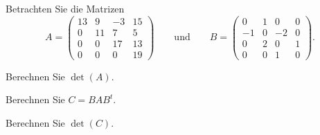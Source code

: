 Betrachten Sie die Matrizen
\[
A=\begin{pmatrix}
13& 9&-3&15\\
 0&11& 7& 5\\
 0& 0&17&13\\
 0& 0& 0&19
\end{pmatrix}
\qquad\text{und}\qquad
B
=
\begin{pmatrix}
   0&  1&  0&  0\\
  -1&  0& -2&  0\\
   0&  2&  0&  1\\
   0&  0&  1&  0
\end{pmatrix}.
\]
\begin{teilaufgaben}
\item Berechnen Sie $\det(A)$.
\item Berechnen Sie $C=BAB^t$.
\item Berechnen Sie $\det(C)$.
\end{teilaufgaben}


